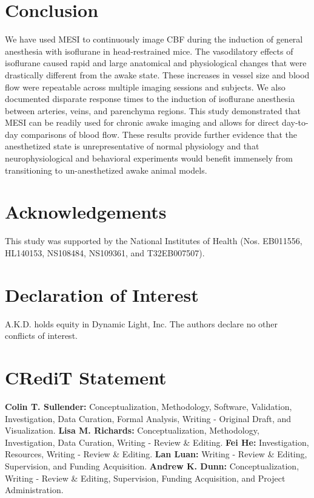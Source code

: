 \documentclass[review]{elsarticle}
\begin{document}
\section{Conclusion}

We have used MESI to continuously image CBF during the induction of general anesthesia with isoflurane in head-restrained mice. The vasodilatory effects of isoflurane caused rapid and large anatomical and physiological changes that were drastically different from the awake state. These increases in vessel size and blood flow were repeatable across multiple imaging sessions and subjects. We also documented disparate response times to the induction of isoflurane anesthesia between arteries, veins, and parenchyma regions. This study demonstrated that MESI can be readily used for chronic awake imaging and allows for direct day-to-day comparisons of blood flow. These results provide further evidence that the anesthetized state is unrepresentative of normal physiology and that neurophysiological and behavioral experiments would benefit immensely from transitioning to un-anesthetized awake animal models.



\section*{Acknowledgements}
This study was supported by the National Institutes of Health (Nos. EB011556, HL140153, NS108484, NS109361, and T32EB007507).

\section*{Declaration of Interest}
A.K.D. holds equity in Dynamic Light, Inc. The authors declare no other conflicts of interest.

\section*{CRediT Statement}
\textbf{Colin T. Sullender:} Conceptualization, Methodology, Software, Validation, Investigation, Data Curation, Formal Analysis, Writing - Original Draft, and Visualization. \textbf{Lisa M. Richards:} Conceptualization, Methodology, Investigation, Data Curation, Writing - Review \& Editing. \textbf{Fei He:} Investigation, Resources, Writing - Review \& Editing. \textbf{Lan Luan:} Writing - Review \& Editing, Supervision, and Funding Acquisition. \textbf{Andrew K. Dunn:} Conceptualization, Writing - Review \& Editing, Supervision, Funding Acquisition, and Project Administration.
\end{document}
